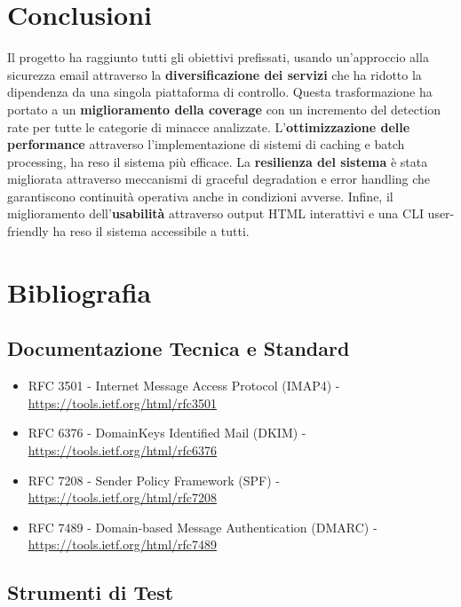 \documentclass{article}
\begin{document}
\section{Conclusioni}

Il progetto ha raggiunto tutti gli obiettivi prefissati, usando un'approccio alla sicurezza email attraverso la \textbf{diversificazione dei servizi} che ha ridotto la dipendenza da una singola piattaforma di controllo. Questa trasformazione ha portato a un \textbf{miglioramento della coverage} con un incremento del detection rate per tutte le categorie di minacce analizzate.
\newline \newline
L'\textbf{ottimizzazione delle performance} attraverso l'implementazione di sistemi di caching e batch processing, ha reso il sistema più efficace. La \textbf{resilienza del sistema} è stata migliorata attraverso meccanismi di graceful degradation e error handling che garantiscono continuità operativa anche in condizioni avverse.
\newline \newline
Infine, il miglioramento dell'\textbf{usabilità} attraverso output HTML interattivi e una CLI user-friendly ha reso il sistema accessibile a tutti.

\newpage

\section{Bibliografia}

\subsection{Documentazione Tecnica e Standard}

\begin{itemize}
    \item RFC 3501 - Internet Message Access Protocol (IMAP4) - \url{https://tools.ietf.org/html/rfc3501}
    \item RFC 6376 - DomainKeys Identified Mail (DKIM) - \url{https://tools.ietf.org/html/rfc6376}
    \item RFC 7208 - Sender Policy Framework (SPF) - \url{https://tools.ietf.org/html/rfc7208}
    \item RFC 7489 - Domain-based Message Authentication (DMARC) - \url{https://tools.ietf.org/html/rfc7489}
\end{itemize}

\subsection{Strumenti di Test}
\end{document}
